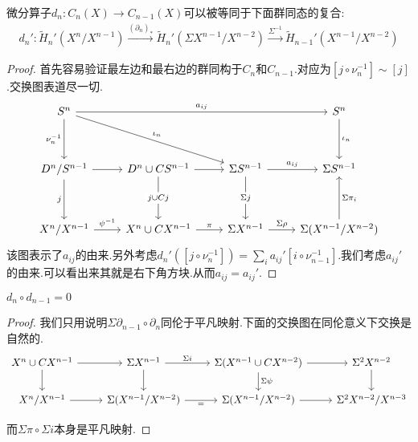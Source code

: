 \begin{lemma}
    微分算子$d_n:C_n(X) \to C_{n-1}(X)$可以被等同于下面群同态的复合:
    \begin{align*}
        d_n':\tilde{H}_n'(X^n/X^{n-1}) \stackrel{(\partial_n)_*}{\longrightarrow}\tilde{H}_n'(\Sigma X^{n-1}/X^{n-2}) \stackrel{\Sigma^{-1}}{\longrightarrow} \tilde{H}_{n-1}'(X^{n-1}/X^{n-2})
    \end{align*}
\end{lemma}
\begin{proof}
    首先容易验证最左边和最右边的群同构于$C_n$和$C_{n-1}$.对应为$[j\circ \nu_n^{-1}] \sim [j]$.交换图表道尽一切.
    \[\begin{tikzcd}
	{S^n} &&& {S^n} \\
	\\
	{D^n/S^{n-1}} & {D^n \cup CS^{n-1}} & {\Sigma S^{n-1}} & {\Sigma S^{n-1}} \\
	\\
	{X^n/X^{n-1}} & {X^n \cup CX^{n-1}} & {\Sigma X^{n-1}} & {\Sigma (X^{n-1}/X^{n-2})}
	\arrow["j"', from=3-1, to=5-1]
	\arrow["{\psi^{-1}}", from=5-1, to=5-2]
	\arrow["\pi", from=5-2, to=5-3]
	\arrow["{\Sigma \rho}", from=5-3, to=5-4]
	\arrow["{\iota_n}", from=1-4, to=3-4]
	\arrow["{\Sigma \pi_i}"', from=5-4, to=3-4]
	\arrow[from=3-1, to=3-2]
	\arrow[from=3-2, to=3-3]
	\arrow["{a_{ij}}", from=3-3, to=3-4]
	\arrow["{j \cup Cj}"{description}, from=3-2, to=5-2]
	\arrow["{\Sigma j}"{description}, from=3-3, to=5-3]
	\arrow["{a_{ij}}", from=1-1, to=1-4]
	\arrow["{\nu_n^{-1}}"', from=1-1, to=3-1]
	\arrow["{\iota_n}", from=1-1, to=3-3]
    \end{tikzcd}\]
 该图表示了$a_{ij}$的由来.另外考虑$d_n'([j\circ \nu_n^{-1}])=\sum_i a_{ij}'[i \circ \nu_{n-1}^{-1}]$.我们考虑$a_{ij}'$的由来.可以看出来其就是右下角方块.从而$a_{ij}=a_{ij}'$.
\end{proof}
\begin{lemma}
    $d_n \circ d_{n-1}=0$
\end{lemma}
\begin{proof}
    我们只用说明$\Sigma \partial_{n-1}\circ \partial_n$同伦于平凡映射.下面的交换图在同伦意义下交换是自然的.
    \[\begin{tikzcd}
	{X^n \cup CX^{n-1}} & {\Sigma X^{n-1}} & {\Sigma(X^{n-1}\cup CX^{n-2})} & {\Sigma^2 X^{n-2}} \\
	{X^n/X^{n-1}} & {\Sigma(X^{n-1}/X^{n-2})} & {\Sigma(X^{n-1}/X^{n-2})} & {\Sigma^2 X^{n-2}/X^{n-3}}
	\arrow[from=1-1, to=1-2]
	\arrow["{\Sigma i}", from=1-2, to=1-3]
	\arrow[from=1-3, to=1-4]
	\arrow[from=1-1, to=2-1]
	\arrow[from=2-1, to=2-2]
	\arrow["{=}"', from=2-2, to=2-3]
	\arrow[from=2-3, to=2-4]
	\arrow[from=1-2, to=2-2]
	\arrow["{\Sigma \psi}", from=1-3, to=2-3]
	\arrow[from=1-4, to=2-4]
\end{tikzcd}\]

    而$\Sigma \pi \circ \Sigma i$本身是平凡映射.
\end{proof}
